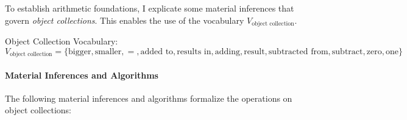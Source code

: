 \documentclass[12pt]{book}
\begin{document}
To establish arithmetic foundations, I explicate some material inferences that govern \textit{object collections}. This enables the use of the vocabulary \(V_{\text{object collection}}\).

Object Collection Vocabulary:
\[
V_{\text{object collection}} = \{\text{bigger}, \text{smaller}, =, \text{added to}, \text{results in}, \text{adding}, \text{result}, \text{subtracted from}, \text{subtract}, \text{zero}, \text{one}\}
\]


\paragraph{Material Inferences and Algorithms}

The following material inferences and algorithms formalize the operations on object collections:
\end{document}
